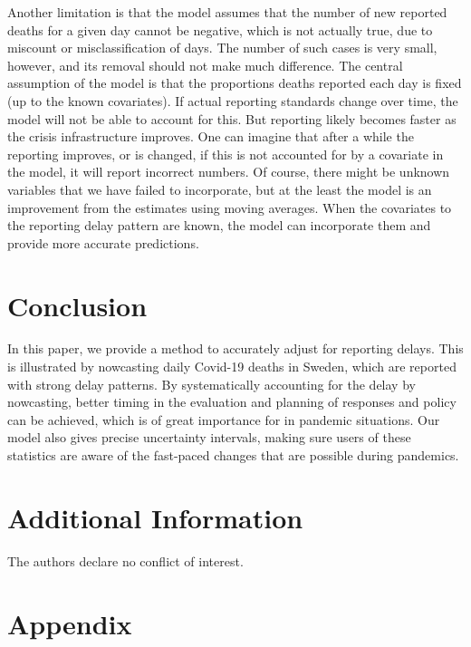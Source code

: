 \documentclass[a4paper,11pth]{article}
\begin{document}
Another limitation is that the model assumes that the number of new reported deaths for a given day cannot be negative, which is not actually true, due to miscount or misclassification of days. The number of such cases is very small, however, and its removal should not make much difference. The central assumption of the model is that the proportions deaths reported each day is fixed (up to the known covariates). If actual reporting standards change over time, the model will not be able to account for this. But reporting likely becomes faster as the crisis infrastructure improves. One can imagine that after a while the reporting improves, or is changed, if this is not accounted for by a covariate in the model, it will report incorrect numbers. Of course, there might be unknown variables that we have failed to incorporate, but at the least the model is an improvement from the estimates using moving averages. When the covariates to the reporting delay pattern are known, the model can incorporate them and provide more accurate predictions. 

\section{Conclusion}
In this paper, we provide a method to accurately adjust for reporting delays. This is illustrated by nowcasting daily Covid-19 deaths in Sweden, which are reported with strong delay patterns. By systematically accounting for the delay by nowcasting, better timing in the evaluation and planning of responses and policy can be achieved, which is of great importance for in pandemic situations. Our model also gives precise uncertainty intervals, making sure users of these statistics are aware of the fast-paced changes that are possible during pandemics.

\section{Additional Information}
The authors declare no conflict of interest.


\newpage



%

\newpage

%
\newpage
%
\newpage

%


\newpage
\appendix
\section{Appendix}
%
\end{document}
